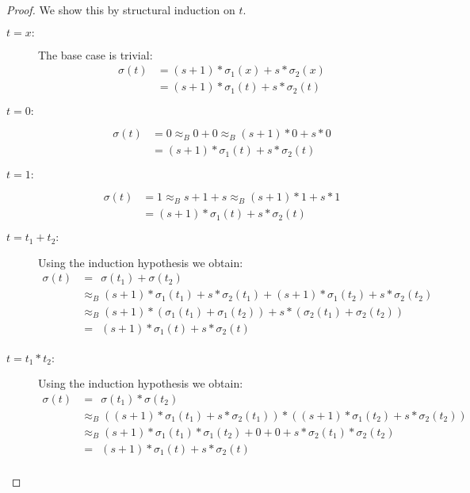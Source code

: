 	\begin{proof}
		We show this by structural induction on $t$.
		\begin{description}
			\item[$t=x:$]The base case is trivial:
			\begin{align*}
				\sigma(t) & =(s+1)*\sigma_1(x)+s*\sigma_2(x) \\
				          & =(s+1)*\sigma_1(t)+s*\sigma_2(t) 
			\end{align*}
			\item[$t=0:$]
			\begin{align*}
				\sigma(t) & =0                               
				\approx_B0+0
				\approx_B(s+1)*0+s*0\\
				          & =(s+1)*\sigma_1(t)+s*\sigma_2(t) 
			\end{align*}
			\item[$t=1:$]
			\begin{align*}
				\sigma(t) & =1                               
				\approx_Bs+1+s
				\approx_B(s+1)*1+s*1\\
				          & =(s+1)*\sigma_1(t)+s*\sigma_2(t) 
			\end{align*}
			\item[$t=t_1+t_2:$]Using the induction hypothesis we obtain:
			\begin{align*}
				\sigma(t) & =\ \ \sigma(t_1)+\sigma(t_2)                                                     \\
				          & \approx_B(s+1)*\sigma_1(t_1)+s*\sigma_2(t_1)+(s+1)*\sigma_1(t_2)+s*\sigma_2(t_2) \\
				          & \approx_B(s+1)*(\sigma_1(t_1)+\sigma_1(t_2))+s*(\sigma_2(t_1)+\sigma_2(t_2))     \\
				          & =\ \ (s+1)*\sigma_1(t)+s*\sigma_2(t)                                             \\
			\end{align*}
			\item[$t=t_1*t_2:$]Using the induction hypothesis we obtain:
			\begin{align*}
				\sigma(t) & =\ \ \sigma(t_1)*\sigma(t_2)                                                         \\
				          & \approx_B((s+1)*\sigma_1(t_1)+s*\sigma_2(t_1))*((s+1)*\sigma_1(t_2)+s*\sigma_2(t_2)) \\
				          & \approx_B(s+1)*\sigma_1(t_1)*\sigma_1(t_2)+0+0+s*\sigma_2(t_1)*\sigma_2(t_2)         \\
				          & =\ \ (s+1)*\sigma_1(t)+s*\sigma_2(t)                                                 \\
			\end{align*}
		\end{description}
	\end{proof}
